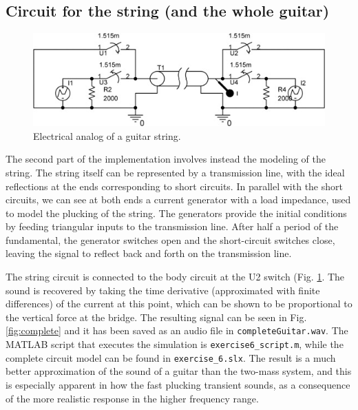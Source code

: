 \documentclass[a4paper]{article}
\begin{document}
\subsection{Circuit for the string (and the whole guitar)}
\begin{figure}[h]
	\centering
	\includegraphics[width=0.7\linewidth]{guitar_string.jpg}
	\caption{Electrical analog of a guitar string.}
	\label{fig:guitarstring}
\end{figure}

The second part of the implementation involves instead the modeling of the string. The string itself can be represented by a transmission line, with the ideal reflections at the ends corresponding to short circuits. In parallel with the short circuits, we can see at both ends a current generator with a load impedance, used to model the plucking of the string. The generators provide the initial conditions by feeding triangular inputs to the transmission line. After half a period of the fundamental, the generator switches open and the short-circuit switches close, leaving the signal to reflect back and forth on the transmission line.

The string circuit is connected to the body circuit at the U2 switch (Fig. \ref{fig:guitarstring}. The sound is recovered by taking the time derivative (approximated with finite differences) of the current at this point, which can be shown to be proportional to the vertical force at the bridge.  The resulting signal can be seen in Fig. \ref{fig:complete} and it has been saved as an audio file in \texttt{completeGuitar.wav}. The MATLAB script that executes the simulation is \texttt{exercise6\_script.m}, while the complete circuit model can be found in \texttt{exercise\_6.slx}. The result is a much better approximation of the sound of a guitar than the two-mass system, and this is especially apparent in how the fast plucking transient sounds, as a consequence of the more realistic response in the higher frequency range.
\end{document}
